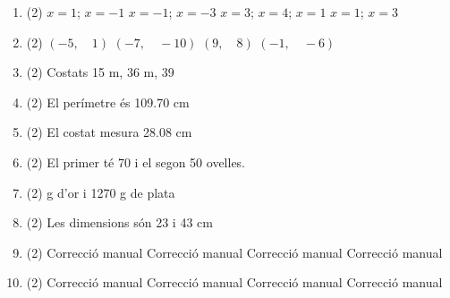 \documentclass[a4paper]{article}
\begin{document}
\begin{enumerate}
\begin{tasks}
      \end{tasks}
      \item
      \begin{tasks}(2)
        \task $x=1$; $x=-1$
        \task $x=-1$; $x=-3$
        \task $x=3$; $x=4$; $x=1$
        \task $x=1$; $x=3$
      \end{tasks}
      \item
      \begin{tasks}(2)
        \task $ \left(-5, \quad 1 \right)$
        \task $ \left(-7, \quad -10 \right)$
        \task $ \left(9, \quad 8 \right)$
        \task $ \left(-1, \quad -6 \right)$
      \end{tasks}
      \item
      \begin{tasks}(2)
        \task Costats 15 m, 36 m, 39
      \end{tasks}
      \item
      \begin{tasks}(2)
        \task El perímetre és 109.70 cm
      \end{tasks}
      \item
      \begin{tasks}(2)
        \task El costat mesura 28.08 cm
      \end{tasks}
      \item
      \begin{tasks}(2)
        \task El primer té 70 i el segon 50 ovelles.
      \end{tasks}
      \item
      \begin{tasks}(2)
         g d'or i 1270 g de plata
      \end{tasks}
      \item
      \begin{tasks}(2)
        \task Les dimensions són 23 i 43 cm
      \end{tasks}
      \item
      \begin{tasks}(2)
        \task Correcció manual
        \task Correcció manual
        \task Correcció manual
        \task Correcció manual
      \end{tasks}
      \item
      \begin{tasks}(2)
        \task Correcció manual
        \task Correcció manual
        \task Correcció manual
        \task Correcció manual
      \end{tasks}
    \end{enumerate}
  
\end{document}
